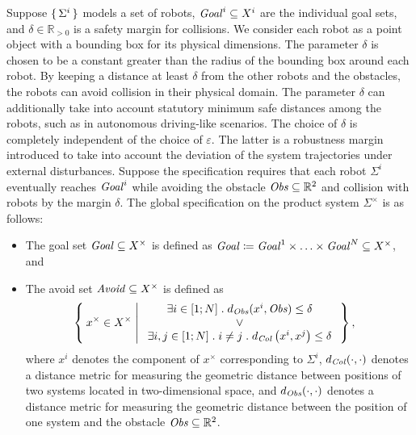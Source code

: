 Suppose $\set{\Sigma^i}$ 
models a set of robots, 
$\mathit{Goal}^i\subseteq X^i$ are the individual goal sets, and $\delta \in \mathbb{R}_{>0}$ is a safety margin for collisions. 
We consider each robot as a point object with a bounding box for its physical dimensions. 
The parameter $\delta$ is chosen to be a constant greater than  the radius of the bounding box around each robot. 
By keeping a distance at least $\delta$ from the other robots and the obstacles, the robots can avoid collision in their physical domain.
The parameter $\delta$ can additionally take into account statutory minimum safe distances among the robots, 
such as in autonomous driving-like scenarios.
The choice of $\delta$ is completely independent of the choice of $\varepsilon$. 
The latter is a robustness margin introduced to take into account the deviation of the system trajectories under external disturbances.
Suppose the specification requires that each robot $\Sigma^i$ eventually reaches $\mathit{Goal}^i$ 
while avoiding the obstacle $\mathit{Obs}\subseteq \mathbb{R}^2$ and collision with robots by the margin $\delta$.
The global specification on the product system $\Sigma^\times$ 
is as follows:
\begin{itemize}
	\item The goal set $\mathit{Goal}\subseteq X^\times$ is defined as $\mathit{Goal} \coloneqq \mathit{Goal}^1\times \ldots \times \mathit{Goal}^N \subseteq X^\times$, and
	\item The avoid set $\mathit{Avoid}\subseteq X^\times$ is defined as 
		\begin{align}
				&\Set{ x^\times\in X^\times | 
					\begin{array}{c}
						\exists i\in [1;N]\;.\; d_{\mathit{Obs}}(x^i,\mathit{Obs}) \leq \delta\\
						\vee\\
						 \exists i,j\in [1;N]\;.\;i\neq j\;.\;d_{\mathit{Col}}\left(x^i,x^j\right)\leq\delta
					\end{array}},
		\end{align}
	where $x^i$ denotes the component of $x^\times$ corresponding to $\Sigma^i$, $d_{\mathit{Col}}(\cdot,\cdot)$ denotes a 
distance metric for measuring the geometric distance between positions of two systems located in two-dimensional space, 
and $d_{\mathit{Obs}}(\cdot,\cdot)$ denotes a distance metric for measuring the geometric distance between the 
position of one system and the obstacle $\mathit{Obs}\subseteq \mathbb{R}^2$.
\end{itemize}
%

